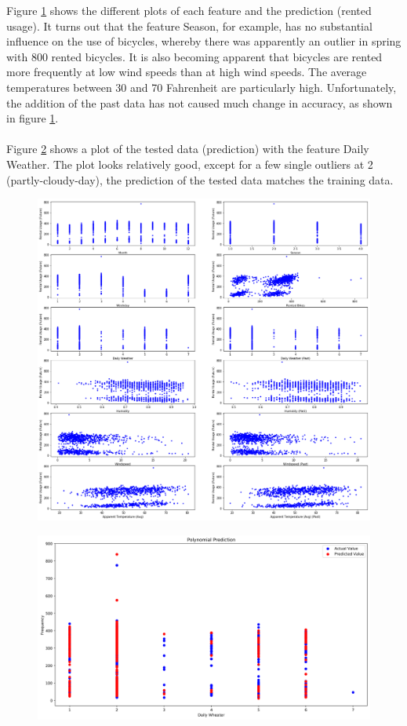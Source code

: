 Figure \ref{fig:figure9_polynomial_features} shows the different plots of each feature and the prediction (rented usage). It turns out
that the feature Season, for example, has no substantial influence on the use of bicycles, whereby
there was apparently an outlier in spring with 800 rented bicycles. It is also becoming apparent
that bicycles are rented more frequently at low wind speeds than at high wind speeds. The average
temperatures between 30 and 70 Fahrenheit are particularly high. Unfortunately, the addition of
the past data has not caused much change in accuracy, as shown in figure \ref{fig:figure9_polynomial_features}.\\\\
Figure \ref{fig:figure10_polynomial_prediction} shows a plot of the tested data (prediction) with the feature \glqq Daily Weather\grqq . The plot looks relatively good, except for a few single outliers at 2 (partly-cloudy-day), the prediction of the
tested data matches the training data.
\begin{figure}[H]
\hspace{-2.8cm}
\includegraphics[width=1.4\textwidth]{img/figure9_polynomial_features}\label{fig:figure9_polynomial_features}
\label{fig:figure9_polynomial_features}
\end{figure}
\begin{figure}[H]
\hspace{-2.4cm}
\includegraphics[width=1.3\textwidth]{img/figure10_polynomial_prediction}\label{fig:figure10_polynomial_prediction}
\label{fig:figure10_polynomial_prediction}
\end{figure}